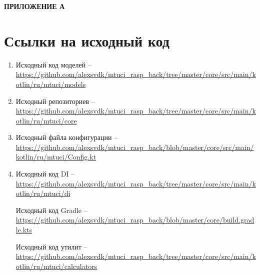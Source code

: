 \newpage
\begin{center}
  \textbf{\large ПРИЛОЖЕНИЕ А}
\end{center}

\section{Ссылки на исходный код}

\begin{enumerate}

  \item
  Исходный код моделей -- 
  \url{https://github.com/alexsvdk/mtuci_rasp_back/tree/master/core/src/main/kotlin/ru/mtuci/models} 
  \label{code:models}

  \item
  Исходный репозиториев -- 
  \url{https://github.com/alexsvdk/mtuci_rasp_back/tree/master/core/src/main/kotlin/ru/mtuci/core} 
  \label{code:repo}

  \item
  Исходный файла конфигурации -- 
  \url{https://github.com/alexsvdk/mtuci_rasp_back/blob/master/core/src/main/kotlin/ru/mtuci/Config.kt} 
  \label{code:config}

  \item
  Исходный код DI --
  \url{https://github.com/alexsvdk/mtuci_rasp_back/tree/master/core/src/main/kotlin/ru/mtuci/di} 
  \label{code:di}

  Исходный код Gradle --
  \url{https://github.com/alexsvdk/mtuci_rasp_back/blob/master/core/build.gradle.kts}
  \label{code:gradle}

  Исходный код утилит --
  \url{https://github.com/alexsvdk/mtuci_rasp_back/tree/master/core/src/main/kotlin/ru/mtuci/calculators}
  \label{code:utils}

\end{enumerate}